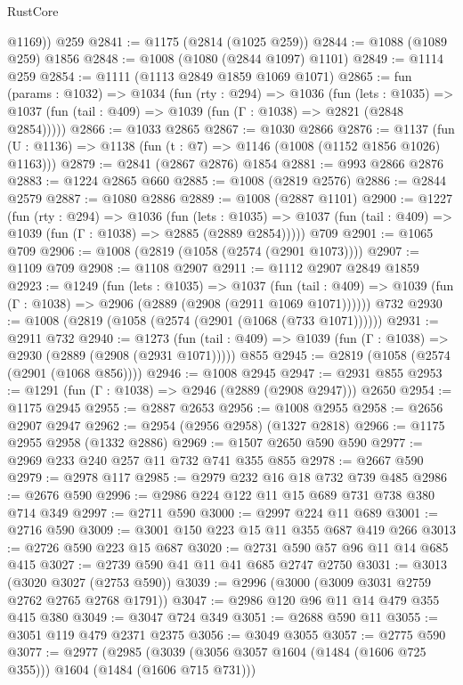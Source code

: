 \begin{lexlean}{RustCore}
\begin{coremodule}
        @1169))
    @259
@2841 := @1175 (@2814 (@1025 @259))
@2844 := @1088 (@1089 @259) @1856
@2848 := @1008 (@1080 (@2844 @1097) @1101)
@2849 := @1114 @259
@2854 := @1111 (@1113 @2849 @1859 @1069 @1071)
@2865 := fun (params : @1032) =>
  @1034
    (fun (rty : @294) =>
    @1036
      (fun (lets : @1035) =>
      @1037 (fun (tail : @409) => @1039 (fun (Γ : @1038) => @2821 (@2848 @2854)))))
@2866 := @1033 @2865
@2867 := @1030 @2866
@2876 := @1137 (fun (U : @1136) => @1138 (fun (t : @7) => @1146 (@1008 (@1152 @1856 @1026) @1163)))
@2879 := @2841 (@2867 @2876) @1854
@2881 := @993 @2866 @2876
@2883 := @1224 @2865 @660
@2885 := @1008 (@2819 @2576)
@2886 := @2844 @2579
@2887 := @1080 @2886
@2889 := @1008 (@2887 @1101)
@2900 := @1227
    (fun (rty : @294) =>
    @1036
      (fun (lets : @1035) =>
      @1037 (fun (tail : @409) => @1039 (fun (Γ : @1038) => @2885 (@2889 @2854)))))
    @709
@2901 := @1065 @709
@2906 := @1008 (@2819 (@1058 (@2574 (@2901 @1073))))
@2907 := @1109 @709
@2908 := @1108 @2907
@2911 := @1112 @2907 @2849 @1859
@2923 := @1249
    (fun (lets : @1035) =>
    @1037
      (fun (tail : @409) => @1039 (fun (Γ : @1038) => @2906 (@2889 (@2908 (@2911 @1069 @1071))))))
    @732
@2930 := @1008 (@2819 (@1058 (@2574 (@2901 (@1068 (@733 @1071))))))
@2931 := @2911 @732
@2940 := @1273
    (fun (tail : @409) => @1039 (fun (Γ : @1038) => @2930 (@2889 (@2908 (@2931 @1071)))))
    @855
@2945 := @2819 (@1058 (@2574 (@2901 (@1068 @856))))
@2946 := @1008 @2945
@2947 := @2931 @855
@2953 := @1291 (fun (Γ : @1038) => @2946 (@2889 (@2908 @2947))) @2650
@2954 := @1175 @2945
@2955 := @2887 @2653
@2956 := @1008 @2955
@2958 := @2656 @2907 @2947
@2962 := @2954 (@2956 @2958) (@1327 @2818)
@2966 := @1175 @2955 @2958 (@1332 @2886)
@2969 := @1507 @2650 @590 @590
@2977 := @2969 @233 @240 @257 @11 @732 @741 @355 @855
@2978 := @2667 @590
@2979 := @2978 @117
@2985 := @2979 @232 @16 @18 @732 @739 @485
@2986 := @2676 @590
@2996 := @2986 @224 @122 @11 @15 @689 @731 @738 @380 @714 @349
@2997 := @2711 @590
@3000 := @2997 @224 @11 @689
@3001 := @2716 @590
@3009 := @3001 @150 @223 @15 @11 @355 @687 @419 @266
@3013 := @2726 @590 @223 @15 @687
@3020 := @2731 @590 @57 @96 @11 @14 @685 @415
@3027 := @2739 @590 @41 @11 @41 @685 @2747 @2750
@3031 := @3013 (@3020 @3027 (@2753 @590))
@3039 := @2996 (@3000 (@3009 @3031 @2759 @2762 @2765 @2768 @1791))
@3047 := @2986 @120 @96 @11 @14 @479 @355 @415 @380
@3049 := @3047 @724 @349
@3051 := @2688 @590 @11
@3055 := @3051 @119 @479 @2371 @2375
@3056 := @3049 @3055
@3057 := @2775 @590
@3077 := @2977
    (@2985
      (@3039 (@3056 @3057 @1604 (@1484 (@1606 @725 @355))) @1604 (@1484 (@1606 @715 @731)))

\end{coremodule}
\end{lexlean}
